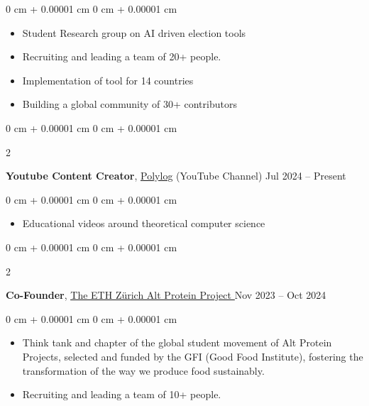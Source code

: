 \documentclass[10pt, letterpaper]{article}
\newenvironment{highlights}{
    \begin{itemize}[
        topsep=0.10 cm,
        parsep=0.10 cm,
        partopsep=0pt,
        itemsep=0pt,
        leftmargin=0 cm + 10pt
    ]
}{
    \end{itemize}
} %
\newenvironment{onecolentry}{
    \begin{adjustwidth}{
        0 cm + 0.00001 cm
    }{
        0 cm + 0.00001 cm
    }
}{
    \end{adjustwidth}
} %
\newenvironment{twocolentry}[2][]{
    \onecolentry
    \def\secondColumn{#2}
    \setcolumnwidth{\fill, 4.5 cm}
    \begin{paracol}{2}
}{
    \switchcolumn \raggedleft \secondColumn
    \end{paracol}
    \endonecolentry
} %
\begin{document}
        \vspace{0.10 cm}
        \begin{onecolentry}
            \begin{highlights}
                \item Student Research group on AI driven election tools
                \item Recruiting and leading a team of 20+ people.
                \item Implementation of tool for 14 countries
                \item Building a global community of 30+ contributors
            \end{highlights}
        \end{onecolentry}


\vspace{0.2cm}


\begin{twocolentry}{
            Jul 2024 – Present
        }
            \textbf{Youtube Content Creator}, \href{https://www.youtube.com/@PolylogCS}{\underline{Polylog}} (YouTube Channel)\end{twocolentry}

        \vspace{0.10 cm}
        \begin{onecolentry}
            \begin{highlights}
                \item Educational videos around theoretical computer science
            \end{highlights}
        \end{onecolentry}

        \vspace{0.2 cm}




      
        \begin{twocolentry}{
            Nov 2023 – Oct 2024
        }
    
            \textbf{Co-Founder}, \href{https://ethzurichaltpro.wordpress.com/}{\underline{The ETH Zürich Alt Protein Project }}\end{twocolentry}


        \vspace{0.10 cm}
        \begin{onecolentry}
            \begin{highlights}
                \item Think tank and chapter of the global student movement of Alt Protein Projects, selected and funded by the GFI (Good Food Institute), fostering the transformation of the way we produce food sustainably.
                \item Recruiting and leading a team of 10+ people.
            \end{highlights}
        \end{onecolentry}
\end{document}

